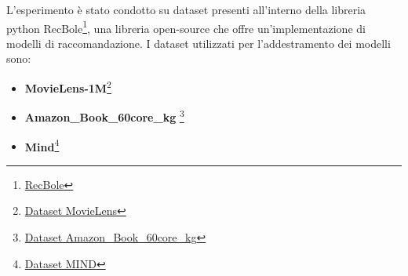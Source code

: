 \noindent L'esperimento è stato condotto su dataset presenti all'interno della libreria python RecBole\footnote{\href{http://recbole.io}{RecBole}}{}, una libreria open-source che offre un'implementazione di modelli di raccomandazione. I dataset utilizzati per l'addestramento dei modelli sono:
\begin{itemize}
    \item \textbf{MovieLens-1M}\footnote{\href{https://github.com/RUCAIBox/RecSysDatasets/blob/master/conversion_tools/usage/MovieLens.md}{Dataset MovieLens}}{}
    \item \textbf{Amazon\_Book\_60core\_kg} \footnote{\href{https://github.com/RUCAIBox/RecSysDatasets/blob/master/conversion_tools/usage/Amazon-book-KG.md}{Dataset Amazon\_Book\_60core\_kg}}{}
    \item \textbf{Mind}\footnote{\href{https://github.com/RUCAIBox/RecSysDatasets/blob/master/conversion_tools/usage/MIND.md}{Dataset MIND}}{}
\end{itemize}



